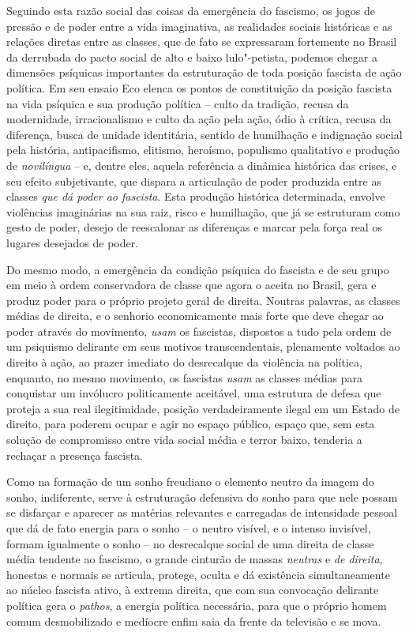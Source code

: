Seguindo esta razão social das coisas da emergência do fascismo, os
jogos de pressão e de poder entre a vida imaginativa, as realidades
sociais históricas e as relações diretas entre as classes, que de fato
se expressaram fortemente no Brasil da derrubada do pacto social de alto
e baixo lulo"-petista, podemos chegar a dimensões psíquicas importantes
da estruturação de toda posição fascista de ação política. Em seu ensaio
Eco elenca os pontos de constituição da posição fascista na vida
psíquica e sua produção política -- culto da tradição, recusa da
modernidade, irracionalismo e culto da ação pela ação, ódio à crítica,
recusa da diferença, busca de unidade identitária, sentido de humilhação
e indignação social pela história, antipacifismo, elitismo, heroísmo,
populismo qualitativo e produção de \emph{novilíngua} -- e, dentre eles,
aquela referência a dinâmica histórica das crises, e seu efeito
subjetivante, que dispara a articulação de poder produzida entre as
classes \emph{que dá poder ao fascista}. Esta produção histórica
determinada, envolve violências imaginárias na sua raiz, risco e
humilhação, que já se estruturam como gesto de poder, desejo de
reescalonar as diferenças e marcar pela força real os lugares desejados
de poder.

Do mesmo modo, a emergência da condição psíquica do fascista e de seu
grupo em meio à ordem conservadora de classe que agora o aceita no
Brasil, gera e produz poder para o próprio projeto geral de direita.
Noutras palavras, as classes médias de direita, e o senhorio
economicamente mais forte que deve chegar ao poder através do movimento,
\emph{usam} os fascistas, dispostos a tudo pela ordem de um psiquismo
delirante em seus motivos transcendentais, plenamente voltados ao
direito à ação, ao prazer imediato do desrecalque da violência na
política, enquanto, no mesmo movimento, os fascistas \emph{usam} as
classes médias para conquistar um invólucro politicamente aceitável, uma
estrutura de defesa que proteja a sua real ilegitimidade, posição
verdadeiramente ilegal em um Estado de direito, para poderem ocupar e
agir no espaço público, espaço que, sem esta solução de compromisso
entre vida social média e terror baixo, tenderia a rechaçar a presença
fascista.

Como na formação de um sonho freudiano o elemento neutro da imagem do
sonho, indiferente, serve à estruturação defensiva do sonho para que
nele possam se disfarçar e aparecer as matérias relevantes e carregadas
de intensidade pessoal que dá de fato energia para o sonho -- o neutro
visível, e o intenso invisível, formam igualmente o sonho -- no
desrecalque social de uma direita de classe média tendente ao fascismo,
o grande cinturão de massas \emph{neutras} e \emph{de direita}, honestas
e normais se articula, protege, oculta e dá existência simultaneamente
ao núcleo fascista ativo, à extrema direita, que com sua convocação
delirante política gera o \emph{pathos}, a energia política necessária,
para que o próprio homem comum desmobilizado e medíocre enfim saia da
frente da televisão e se mova.


